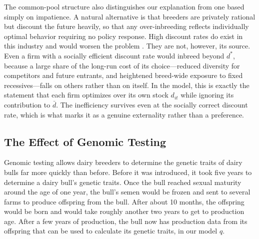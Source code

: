 \documentclass[12pt,letterpaper]{article}
\begin{document}
The common-pool structure also distinguishes our explanation from one based simply on impatience. A natural alternative is that breeders are privately rational but discount the future heavily, so that any over-inbreeding reflects individually optimal behavior requiring no policy response. High discount rates do exist in this industry and would worsen the problem \citep{Wuepper2023}. They are not, however, its source. Even a firm with a socially efficient discount rate would inbreed beyond $d^{*}$, because a large share of the long-run cost of its choice---reduced diversity for competitors and future entrants, and heightened breed-wide exposure to fixed recessives---falls on others rather than on itself. In the model, this is exactly the statement that each firm optimizes over its own stock $d_{it}$ while ignoring its contribution to $\bar{d}$. The inefficiency survives even at the socially correct discount rate, which is what marks it as a genuine externality rather than a preference.

\subsection{The Effect of Genomic Testing\label{subsec:effects_gt}}
Genomic testing allows dairy breeders to determine the genetic traits of dairy bulls far more quickly than before.
Before it was introduced, it took five years to determine a dairy bull's genetic traits.
Once the bull reached sexual maturity around the age of one year, the bull's semen would be frozen and sent to several farms to produce offspring from the bull.
After about 10 months, the offspring would be born and would take roughly another two years to get to production age. 
After a few years of production, the bull now has production data from its offspring that can be used to calculate its genetic traits, in our model $q$.
\end{document}
